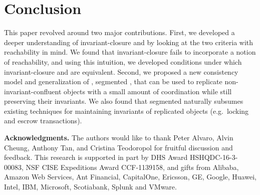 \section{Conclusion}
This paper revolved around two major contributions.  First, we developed a
deeper understanding of invariant-closure and \invariantconfluence{} by looking at the
two criteria with reachability in mind. We found that invariant-closure fails
to incorporate a notion of reachability, and using this intuition, we developed
conditions under which invariant-closure and \invariantconfluence{} are equivalent.
Second, we proposed a new consistency model and generalization of
\invariantconfluence{}, segmented \invariantconfluence{}, that can be used to replicate
non-invariant-confluent objects with a small amount of coordination while still
preserving their invariants. We also found that segmented \invariantconfluence{}
naturally subsumes existing techniques for maintaining invariants of replicated
objects (e.g.\ locking and escrow transactions).

\textbf{Acknowledgments.}
The authors would like to thank Peter Alvaro, Alvin Cheung, Anthony Tan,
and Cristina Teodoropol for fruitful discussion and feedback.
%
This research is supported in part by DHS Award HSHQDC-16-3-00083, NSF CISE
Expeditions Award CCF-1139158, and gifts from Alibaba, Amazon Web Services, Ant
Financial, CapitalOne, Ericsson, GE, Google, Huawei, Intel, IBM, Microsoft,
Scotiabank, Splunk and VMware.
